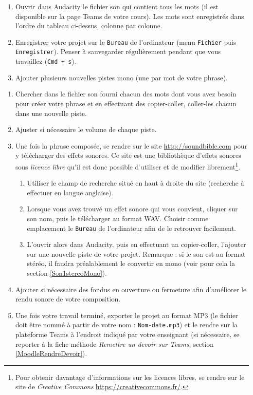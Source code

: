 {\begin{enumerate}
\item Ouvrir dans Audacity le fichier son qui contient tous les mots (il est disponible sur la page Teams de votre cours). Les mots sont enregistrés dans l'ordre du tableau ci-dessus, colonne par colonne.
\item Enregistrer votre projet sur le \texttt{Bureau} de l'ordinateur (menu \texttt{Fichier} puis \texttt{Enregistrer}). Penser à sauvegarder régulièrement pendant que vous travaillez (\texttt{Cmd + s}).   
\item Ajouter plusieurs nouvelles pistes mono (une par mot de votre phrase). 
\setcounter{tmp}{\value{enumi}}  
\end{enumerate}
\begin{enumerate}
\setcounter{enumi}{\value{tmp}}
\item Chercher dans le fichier son fourni chacun des mots dont vous avez besoin pour créer votre phrase et en effectuant des copier-coller, coller-les chacun dans une nouvelle piste.
\item Ajuster si nécessaire le volume de chaque piste.
\item Une fois la phrase composée, se rendre sur le site \url{http://soundbible.com} pour y télécharger des effets sonores. Ce site est une bibliothèque d'effets sonores sous \emph{licence libre} qu'il est donc possible d'utiliser et de modifier librement\footnote{Pour obtenir davantage d'informations sur les licences libres, se rendre sur le site de \emph{Creative Commons} \url{https://creativecommons.fr/}.}.
        \begin{enumerate}
        \item Utiliser le champ de recherche situé en haut à droite du site (recherche à effectuer en langue anglaise).
        \item Lorsque vous avez trouvé un effet sonore qui vous convient, cliquer sur son nom, puis le télécharger au format WAV. Choisir comme emplacement le \texttt{Bureau} de l'ordinateur afin de le retrouver facilement.
        \item L'ouvrir alors dans Audacity, puis en effectuant un copier-coller, l'ajouter sur une nouvelle piste de votre projet. Remarque : si le son est au format stéréo, il faudra préalablement le convertir en mono (voir pour cela la section \vref{Son1stereoMono}). 
        \end{enumerate}
\item Ajouter si nécessaire des fondus en ouverture ou fermeture afin d'améliorer le rendu sonore de votre composition.
\item Une fois votre travail terminé, exporter le projet au format MP3 (le fichier doit être nommé à partir de votre nom : \texttt{Nom-date.mp3}) et le rendre sur la plateforme Teams à l'endroit indiqué par votre enseignant (si nécessaire, se reporter à la fiche méthode \emph{Remettre un devoir sur Teams}, section \vref{MoodleRendreDevoir}). 
\end{enumerate}

}%

